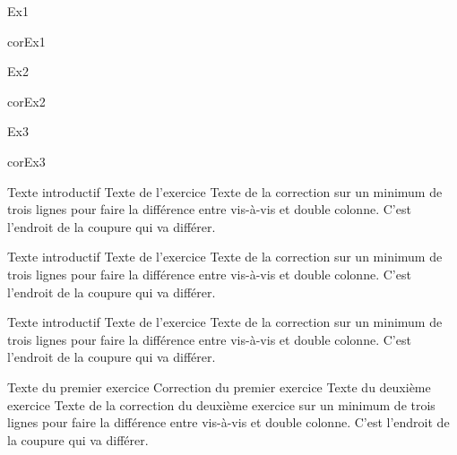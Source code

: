 \documentclass[nocrop]{sesamanuel}
\begin{document}
\begin{autoeval}
    \begin{multicols}{2}
      \begin{exercice}
        Ex1
      \end{exercice}
      \begin{corrige}
        corEx1
      \end{corrige}
      \begin{exercice}
        Ex2
      \end{exercice}
      \begin{corrige}
        corEx2
      \end{corrige}
  \vfill \columnbreak
      \begin{exercice}
        Ex3
      \end{exercice}
      \begin{corrige}
        corEx3
      \end{corrige}
    \end{multicols}
  \end{autoeval}

  \cours  
  \begin{methode}
    Texte introductif
    \exercice
    Texte de l’exercice
    \correction
    Texte de la correction sur un minimum de trois lignes pour faire la
    différence entre vis-à-vis et double colonne. C’est l’endroit de la
    coupure qui va différer.
  \end{methode}
  
  \begin{methode*1}
    Texte introductif
    \exercice
    Texte de l’exercice
    \correction
    Texte de la correction sur un minimum de trois lignes pour faire la
    différence entre vis-à-vis et double colonne. C’est l’endroit de la
    coupure qui va différer.
  \end{methode*1}
  
  \begin{methode*2}
    Texte introductif
    \exercice
    Texte de l’exercice
    \correction
    Texte de la correction sur un minimum de trois lignes pour faire la
    différence entre vis-à-vis et double colonne. C’est l’endroit de la
    coupure qui va différer.
  \end{methode*2}
  
  \begin{methode*2*2}
    \exercice    
    Texte du premier exercice
    \correction
    Correction du premier exercice
    \exercice
    Texte du deuxième exercice
    \correction
    Texte de la correction du deuxième exercice sur un minimum de trois
    lignes pour faire la différence entre vis-à-vis et double
    colonne. C’est l’endroit de la coupure qui va différer.
  \end{methode*2*2}
\end{document}
